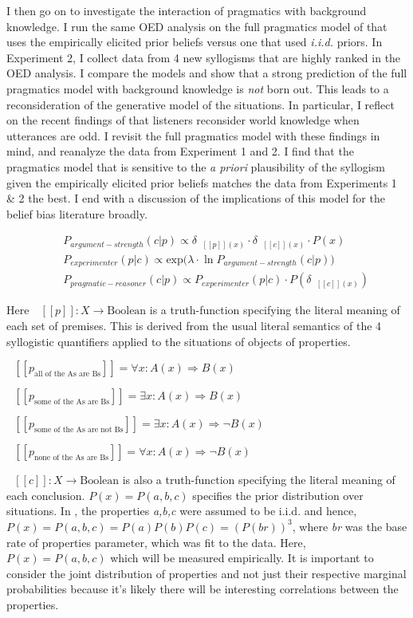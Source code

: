 \documentclass{llncs} %
\newcommand{\denote}[1]{\mbox{ $[\![ #1 ]\!]$}}
\begin{document}
I then go on to investigate the interaction of pragmatics with background knowledge. I run the same OED analysis on the full pragmatics model of  that uses the empirically elicited prior beliefs versus one that used \emph{i.i.d.} priors. In Experiment 2, I collect data from 4 new syllogisms that are highly ranked in the OED analysis. I compare the models and show that a strong prediction of the full pragmatics model with background knowledge is \emph{not} born out. This leads to a reconsideration of the generative model of the situations. In particular, I reflect on the recent findings of  that listeners reconsider world knowledge when utterances are odd. I revisit the full pragmatics model with these findings in mind, and reanalyze the data from Experiment 1 and 2. I find that the pragmatics model that is sensitive to the \emph{a priori} plausibility of the syllogism given the empirically elicited prior beliefs matches the data from Experiments 1 \& 2 the best. I end with a discussion of the implications of this model for the belief bias literature broadly. 


\begin{eqnarray}
&&P_{argument-strength}(c|p)\propto \delta_{\denote{p}(x)} \cdot  \delta_{\denote{c}(x)} \cdot P(x) \\ %
&&P_{experimenter}(p|c) \propto \mathrm{exp}({\lambda \cdot \ln P_{argument-strength}(c|p))}\\ 
&&P_{pragmatic-reasoner}(c|p)\propto P_{experimenter}(p|c)\cdot P(\delta_{\denote{c}(x)})
\end{eqnarray}

Here $\denote{p}: X \rightarrow \text{Boolean}$ is a truth-function specifying the literal meaning of each set of premises. This is derived from the 
usual literal semantics of the 4 syllogistic quantifiers applied to the situations of objects of properties. 

$\denote{p_{\textrm{all of the As are Bs}}}=\forall{x}: A(x) \Rightarrow B(x)$

$\denote{p_{\textrm{some of the As are Bs}}}= \exists{x}: A(x) \Rightarrow B(x)$

$\denote{p_{\textrm{some of the As are not Bs}}}= \exists{x}: A(x) \Rightarrow \neg{B(x)}$

$\denote{p_{\textrm{none of the As are Bs}}}= \forall{x}: A(x) \Rightarrow \neg{B(x)}$

$\denote{c}: X \rightarrow \text{Boolean}$ is also a truth-function specifying the literal meaning of each conclusion. $P(x) = P(a,b,c)$ specifies the prior distribution over situations. In , the properties \emph{a,b,c} were assumed to be i.i.d. and hence, $P(x) = P(a, b, c) = P(a)P(b)P(c) = (P(br))^3$, where \emph{br} was the base rate of properties parameter, which was fit to the data. Here, $P(x) = P(a,b,c)$ which will be measured empirically. It is important to consider the joint distribution of properties and not just their respective marginal probabilities because it's likely there will be interesting correlations between the properties.
\end{document}

